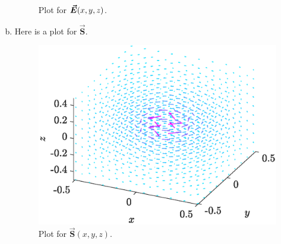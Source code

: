 \documentclass[12pt]{article} %
\begin{document}
\begin{solution}
\begin{enumerate}[(a)]
\begin{figure}[H]
        \caption{Plot for $\boldsymbol{\vec{E}}(x,y,z)$.}
    \end{figure}
    \item Here is a plot for $\boldsymbol{\vec{S}}$.
    \begin{figure}[H]
        \centering
        \includegraphics[width=.65\textwidth]{figures/4d}
        \caption{Plot for $\boldsymbol{\vec{S}}(x,y,z)$.}
    \end{figure}
\end{enumerate}
\end{solution}
\end{document}
